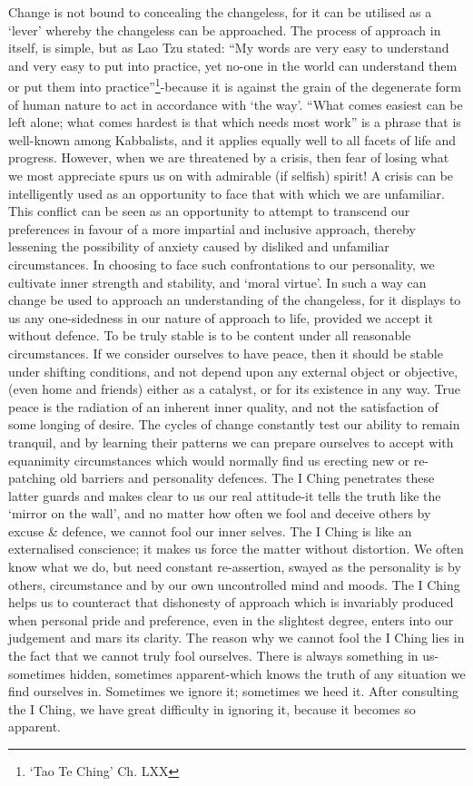 \documentclass[11pt]{book}
\begin{document}
Change is not bound to concealing the changeless, for it can be utilised as a `lever' whereby the changeless can be approached. The process of approach in itself, is simple, but as Lao Tzu stated: ``My words are very easy to understand and very easy to put into practice, yet no-one in the world can understand them or put them into practice''\footnote{`Tao Te Ching' Ch. LXX}-because it is against the grain of the degenerate form of human nature to act in accordance with `the way'. ``What comes easiest can be left alone; what comes hardest is that which needs most work'' is a phrase that is well-known among Kabbalists, and it applies equally well to all facets of life and progress. However, when we are threatened by a crisis, then fear of losing what we most appreciate spurs us on with admirable (if selfish) spirit! A crisis can be intelligently used as an opportunity to face that with which we are unfamiliar. This conflict can be seen as an opportunity to attempt to transcend our preferences in favour of a more impartial and inclusive approach, thereby lessening the possibility of anxiety caused by disliked and unfamiliar circumstances. In choosing to face such confrontations to our personality, we cultivate inner strength and stability, and `moral virtue'. In such a way can change be used to approach an understanding of the changeless, for it displays to us any one-sidedness in our nature of approach to life, provided we accept it without defence. To be truly stable is to be content under all reasonable circumstances. If we consider ourselves to have peace, then it should be stable under shifting conditions, and not depend upon any external object or objective, (even home and friends) either as a catalyst, or for its existence in any way. True peace is the radiation of an inherent inner quality, and not the satisfaction of some longing of desire. The cycles of change constantly test our ability to remain tranquil, and by learning their patterns we can prepare ourselves to accept with equanimity circumstances which would normally find us erecting new or re-patching old barriers and personality defences. The I Ching penetrates these latter guards and makes clear to us our real attitude-it tells the truth like the `mirror on the wall', and no matter how often we fool and deceive others by excuse \& defence, we cannot fool our inner selves. The I Ching is like an externalised conscience; it makes us force the matter without distortion. We often know what we do, but need constant re-assertion, swayed as the personality is by others, circumstance and by our own uncontrolled mind and moods. The I Ching helps us to counteract that dishonesty of approach which is invariably produced when personal pride and preference, even in the slightest degree, enters into our judgement and mars its clarity. The reason why we cannot fool the I Ching lies in the fact that we cannot truly fool ourselves. There is always something in us-sometimes hidden, sometimes apparent-which knows the truth of any situation we find ourselves in. Sometimes we ignore it; sometimes we heed it. After consulting the I Ching, we have great difficulty in ignoring it, because it becomes so apparent.
\end{document}
